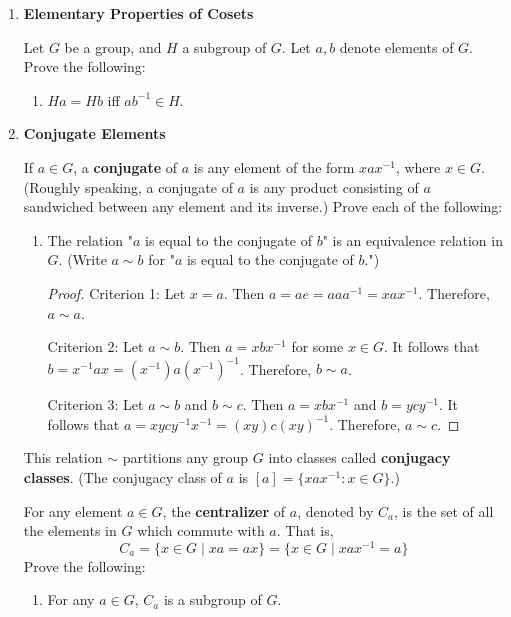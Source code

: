 \documentclass[../notes.tex]{subfiles}
\begin{document}
\begin{enumerate}[label={\textbf{\Alph*.}}]
\begin{enumerate}
\begin{proof}
        \end{proof}
    \end{enumerate}
    \item \textbf{Elementary Properties of Cosets}\par
    Let $G$ be a group, and $H$ a subgroup of $G$. Let $a,b$ denote elements of $G$. Prove the following:
    \begin{enumerate}
        \item $Ha=Hb$ iff $ab^{-1}\in H$.
    \end{enumerate}
    \setcounter{enumi}{8}
    \item \textbf{Conjugate Elements}\par
    If $a\in G$, a \textbf{conjugate} of $a$ is any element of the form $xax^{-1}$, where $x\in G$. (Roughly speaking, a conjugate of $a$ is any product consisting of $a$ sandwiched between any element and its inverse.) Prove each of the following:
    \begin{enumerate}
        \item The relation "$a$ is equal to the conjugate of $b$" is an equivalence relation in $G$. (Write $a\sim b$ for "$a$ is equal to the conjugate of $b$.")
        \begin{proof}
            Criterion 1: Let $x=a$. Then $a=ae=aaa^{-1}=xax^{-1}$. Therefore, $a\sim a$.\par
            Criterion 2: Let $a\sim b$. Then $a=xbx^{-1}$ for some $x\in G$. It follows that $b=x^{-1}ax=(x^{-1})a(x^{-1})^{-1}$. Therefore, $b\sim a$.\par
            Criterion 3: Let $a\sim b$ and $b\sim c$. Then $a=xbx^{-1}$ and $b=ycy^{-1}$. It follows that $a=xycy^{-1}x^{-1}=(xy)c(xy)^{-1}$. Therefore, $a\sim c$.
        \end{proof}
    \end{enumerate}
    This relation $\sim$ partitions any group $G$ into classes called \textbf{conjugacy classes}. (The conjugacy class of $a$ is $[a]=\{xax^{-1}:x\in G\}$.)\par
    For any element $a\in G$, the \textbf{centralizer} of $a$, denoted by $C_a$, is the set of all the elements in $G$ which commute with $a$. That is,
    \begin{equation*}
        C_a = \{x\in G\mid xa=ax\}
        = \{x\in G\mid xax^{-1}=a\}
    \end{equation*}
    Prove the following:
    \begin{enumerate}[resume]
        \item For any $a\in G$, $C_a$ is a subgroup of $G$.

\end{enumerate}
\end{enumerate}
\end{document}

